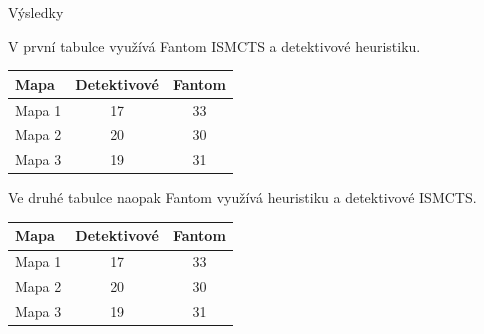 \documentclass[portrait,a0paper,fontscale=0.25]{baposter}
\begin{document}
\begin{poster}
\begin{posterbox}[column=1, name=result1]{Výsledky}
\vspace{0.5cm}

V první tabulce využívá Fantom ISMCTS a detektivové heuristiku.

\vspace{0.3cm}

\begin{center}
\label{tab:mcts-heur}
\begin{tabular}{@{}lcc@{}}
    \toprule
    \textbf{Mapa} & \textbf{Detektivové} & \textbf{Fantom} \\
    \midrule
    Mapa 1 & 17 & 33 \\
    Mapa 2 & 20 & 30 \\
    Mapa 3 & 19 & 31 \\
    \bottomrule
\end{tabular}
\end{center}

\vspace{0.5cm}


Ve druhé tabulce naopak Fantom využívá heuristiku a detektivové ISMCTS.

\vspace{0.3cm}


\begin{center}
\label{tab:mcts-heur}
\begin{tabular}{@{}lcc@{}}
    \toprule
    \textbf{Mapa} & \textbf{Detektivové} & \textbf{Fantom} \\
    \midrule
    Mapa 1 & 17 & 33 \\
    Mapa 2 & 20 & 30 \\
    Mapa 3 & 19 & 31 \\
    \bottomrule
\end{tabular}
\end{center}







\end{posterbox}
\end{poster}
\end{document}
